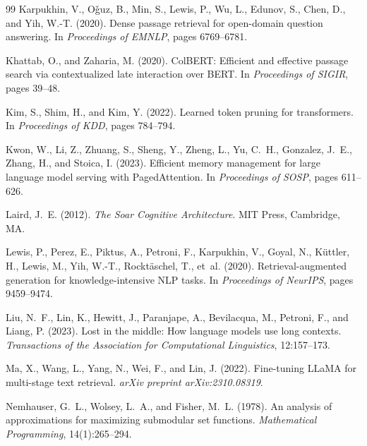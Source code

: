 \documentclass[review,12pt]{elsarticle}
\begin{document}
\begin{thebibliography}{99}
Karpukhin, V., O{\v{g}}uz, B., Min, S., Lewis, P., Wu, L., Edunov, S.,
  Chen, D., and Yih, W.-T. (2020).
\newblock Dense passage retrieval for open-domain question answering.
\newblock In \textit{Proceedings of EMNLP}, pages 6769--6781.

Khattab, O., and Zaharia, M. (2020).
\newblock ColBERT: Efficient and effective passage search via contextualized
  late interaction over BERT.
\newblock In \textit{Proceedings of SIGIR}, pages 39--48.

Kim, S., Shim, H., and Kim, Y. (2022).
\newblock Learned token pruning for transformers.
\newblock In \textit{Proceedings of KDD}, pages 784--794.

Kwon, W., Li, Z., Zhuang, S., Sheng, Y., Zheng, L., Yu, C.~H., Gonzalez,
  J.~E., Zhang, H., and Stoica, I. (2023).
\newblock Efficient memory management for large language model serving with
  PagedAttention.
\newblock In \textit{Proceedings of SOSP}, pages 611--626.

Laird, J.~E. (2012).
\newblock \textit{The Soar Cognitive Architecture}.
\newblock MIT Press, Cambridge, MA.

Lewis, P., Perez, E., Piktus, A., Petroni, F., Karpukhin, V., Goyal, N.,
  K{\"u}ttler, H., Lewis, M., Yih, W.-T., Rockt{\"a}schel, T., et~al. (2020).
\newblock Retrieval-augmented generation for knowledge-intensive NLP tasks.
\newblock In \textit{Proceedings of NeurIPS}, pages 9459--9474.

Liu, N.~F., Lin, K., Hewitt, J., Paranjape, A., Bevilacqua, M., Petroni, F.,
  and Liang, P. (2023).
\newblock Lost in the middle: How language models use long contexts.
\newblock \textit{Transactions of the Association for Computational
  Linguistics}, 12:157--173.

Ma, X., Wang, L., Yang, N., Wei, F., and Lin, J. (2022).
\newblock Fine-tuning LLaMA for multi-stage text retrieval.
\newblock \textit{arXiv preprint arXiv:2310.08319}.

Nemhauser, G.~L., Wolsey, L.~A., and Fisher, M.~L. (1978).
\newblock An analysis of approximations for maximizing submodular set functions.
\newblock \textit{Mathematical Programming}, 14(1):265--294.


\end{thebibliography}
\end{document}
